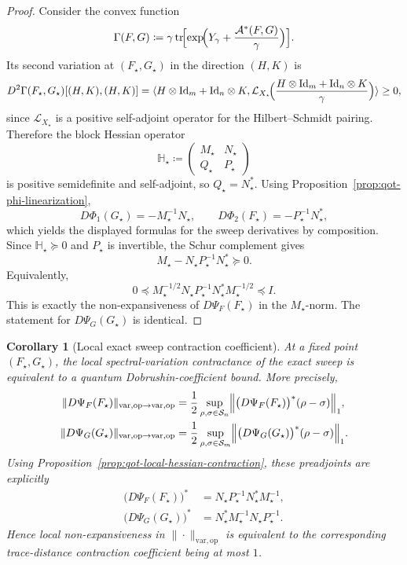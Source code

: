 \documentclass[11pt]{article}
\newcommand{\Id}{\mathrm{Id}}
\newcommand{\tr}{\operatorname{tr}}
\newcommand{\eqdef}{\coloneqq}
\newcommand{\dotp}[2]{\langle #1,#2\rangle}
\newcommand{\Ss}{\mathcal{S}}
\newcommand{\Aa}{\mathcal{A}}
\newcommand{\op}{\mathrm{op}}
\newcommand{\varop}{\mathrm{var},\op}
\theoremstyle{plain}
\newtheorem{corollary}[proposition]{Corollary}
\begin{document}
\begin{proof}
Consider the convex function
\[
\Gamma(F,G)
\eqdef
\gamma \tr\!\Bigl[\exp\!\Bigl(Y_\gamma + \frac{\Aa^\ast(F,G)}{\gamma}\Bigr)\Bigr].
\]
Its second variation at $(F_\star,G_\star)$ in the direction $(H,K)$ is
\[
D^2\Gamma(F_\star,G_\star)[(H,K),(H,K)]
=
\dotp{H \otimes \Id_m + \Id_n \otimes K}
{\mathcal L_{X_\star}\!\Bigl(\frac{H \otimes \Id_m + \Id_n \otimes K}{\gamma}\Bigr)}
\ge 0,
\]
since $\mathcal L_{X_\star}$ is a positive self-adjoint operator for the Hilbert--Schmidt pairing.
Therefore the block Hessian operator
\[
\mathbb H_\star
\eqdef
\begin{pmatrix}
M_\star & N_\star \\
Q_\star & P_\star
\end{pmatrix}
\]
is positive semidefinite and self-adjoint, so $Q_\star=N_\star^\ast$.
Using Proposition~\ref{prop:qot-phi-linearization},
\[
D\Phi_1(G_\star)=-M_\star^{-1}N_\star,
\qquad
D\Phi_2(F_\star)=-P_\star^{-1}N_\star^\ast,
\]
which yields the displayed formulas for the sweep derivatives by composition.
Since $\mathbb H_\star \succeq 0$ and $P_\star$ is invertible, the Schur complement gives
\[
M_\star - N_\star P_\star^{-1} N_\star^\ast \succeq 0.
\]
Equivalently,
\[
0 \preceq
M_\star^{-1/2} N_\star P_\star^{-1} N_\star^\ast M_\star^{-1/2}
\preceq I.
\]
This is exactly the non-expansiveness of $D\Psi_F(F_\star)$ in the $M_\star$-norm. The statement for $D\Psi_G(G_\star)$ is identical.
\end{proof}

\begin{corollary}[Local exact sweep contraction coefficient]
\label{cor:qot-local-dobrushin-sweep}
At a fixed point $(F_\star,G_\star)$, the local spectral-variation contractance of the exact sweep is equivalent to a quantum Dobrushin-coefficient bound.
More precisely,
\begin{align}
\|D\Psi_F(F_\star)\|_{\varop\to\varop}
&=
\frac12
\sup_{\rho,\sigma\in \Ss_n}
\Bigl\|
\bigl(D\Psi_F(F_\star)\bigr)^\ast(\rho-\sigma)
\Bigr\|_1,
\label{eq:qot-local-dobrushin-F}\\
\|D\Psi_G(G_\star)\|_{\varop\to\varop}
&=
\frac12
\sup_{\rho,\sigma\in \Ss_m}
\Bigl\|
\bigl(D\Psi_G(G_\star)\bigr)^\ast(\rho-\sigma)
\Bigr\|_1.
\label{eq:qot-local-dobrushin-G}
\end{align}
Using Proposition~\ref{prop:qot-local-hessian-contraction}, these preadjoints are explicitly
\begin{align*}
\bigl(D\Psi_F(F_\star)\bigr)^\ast
&=
N_\star P_\star^{-1}N_\star^\ast M_\star^{-1},\\
\bigl(D\Psi_G(G_\star)\bigr)^\ast
&=
N_\star^\ast M_\star^{-1}N_\star P_\star^{-1}.
\end{align*}
Hence local non-expansiveness in $\|\cdot\|_{\varop}$ is equivalent to the corresponding trace-distance contraction coefficient being at most $1$.
\end{corollary}
\end{document}
